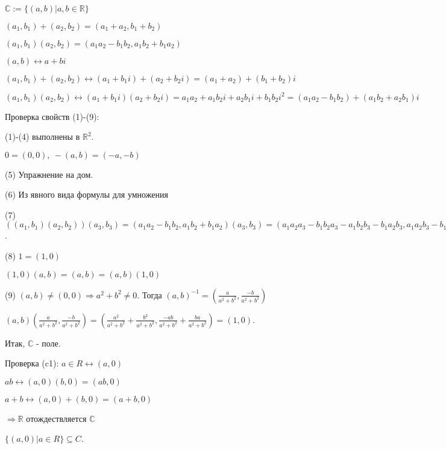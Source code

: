 \vspace{\baselineskip}
$\mathbb{C} := \{(a,b) | a, b \in \mathbb{R}\}$

\vspace{\baselineskip}
$(a_1, b_1) + (a_2, b_2) = (a_1 + a_2, b_1 + b_2)$

$(a_1, b_1) (a_2, b_2) = (a_1 a_2 - b_1 b_2, a_1 b_2 + b_1 a_2)$

$(a, b) \leftrightarrow a + bi$

$(a_1, b_1) + (a_2, b_2) \leftrightarrow (a_1 + b_1 i) + (a_2 + b_2 i) = (a_1 + a_2) + (b_1 + b_2)i$

$(a_1, b_1) (a_2, b_2) \leftrightarrow (a_1 + b_1 i) (a_2 + b_2 i) = a_1 a_2 + a_1 b_2 i + a_2 b_1 i + b_1 b_2 i^2 = (a_1 a_2 - b_1 b_2) + (a_1 b_2 + a_2 b_1)i$

\vspace{\baselineskip}
Проверка свойств (1)-(9):

(1)-(4) выполнены в $\mathbb{R}^2$.

$0 = (0,0), \ -(a, b) = (-a, -b)$

(5) $\textit{Упражнение на дом.}$

(6) Из явного вида формулы для умножения

(7) $((a_1, b_1) (a_2, b_2)) (a_3, b_3) = (a_1 a_2 - b_1 b_2, a_1 b_2 + b_1 a_2) (a_3, b_3) = (a_1 a_2 a_3 - b_1 b_2 a_3 - a_1 b_2 b_3 - b_1 a_2 b_3, a_1 a_2 b_3 - b_1 b_2 b_3 + a_1 b_2 a_3 + b_1 a_2 a_3) = (a_1, b_1)(a_2 a_3 - b_2 b_3, a_2 b_3 + b_2 a_3) = (a_1, b_1) ((a_2, b_2)(a_3, b_3))$.

(8) $1 = (1, 0)$

$(1,0)(a, b) = (a, b) = (a, b)(1, 0)$

(9) $(a, b) \neq (0,0) \Rightarrow a^2 + b^2 \neq 0$. Тогда $(a, b)^{-1} = (\frac{a}{a^2 + b^2}, \frac{-b}{a^2 + b^2})$

$(a, b) (\frac{a}{a^2 + b^2}, \frac{-b}{a^2 + b^2}) = (\frac{a^2}{a^2 + b^2} + \frac{b^2}{a^2 + b^2}, \frac{-ab}{a^2 + b^2} + \frac{ba}{a^2 + b^2}) = (1, 0)$.

\vspace{\baselineskip}
Итак, $\mathbb{C}$ - поле.

Проверка (c1):
$a \in R \leftrightarrow (a, 0)$

$ab \leftrightarrow (a, 0)(b, 0) = (ab, 0)$

$a+b \leftrightarrow (a, 0) + (b, 0) = (a+b, 0)$

$\Rightarrow \mathbb{R}$ отождествляется $\mathbb{C}$

$\{(a, 0) | a \in R \} \subseteq C$.

